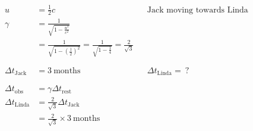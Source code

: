 \documentclass[12pt]{article}
\begin{document}
\begin{align*}
	u                     & = \frac{1}{2} c                                                                                           &  & \text{Jack moving towards Linda} \\
	\gamma                & = \frac{1}{\sqrt{1 - \frac{u^2}{c^2}}}                                                                                                          \\
	                      & = \frac{1}{\sqrt{1 - \left(\frac{1}{2}\right)^2}} = \frac{1}{\sqrt{1 - \frac{1}{4}}} = \frac{2}{\sqrt{3}}                                       \\
	\phantom{=}                                                                                                                                                             \\
	\Delta t_\text{Jack}  & = 3 ~ \text{months}                                                                                       &  & \Delta t_\text{Linda} = \  ?     \\
	\phantom{=}                                                                                                                                                             \\
	\Delta t_\text{obs}   & = \gamma \Delta t_\text{rest}                                                                                                                   \\
	\Delta t_\text{Linda} & = \frac{2}{\sqrt{3}} \Delta t_\text{Jack}                                                                                                       \\
	                      & = \frac{2}{\sqrt{3}} \times 3 ~ \text{months}                                                                                                   \\
\end{align*}
\end{document}
